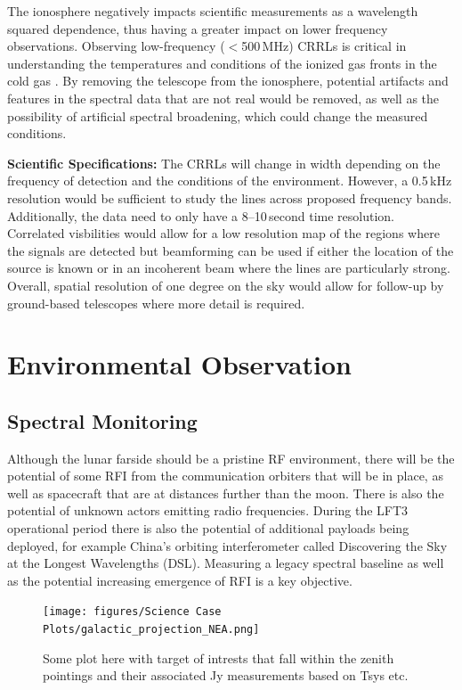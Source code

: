 The ionosphere negatively impacts scientific measurements as a wavelength squared dependence, thus having a greater impact on lower frequency observations. Observing low-frequency ($<$500\,MHz) CRRLs is critical in understanding the temperatures and conditions of the ionized gas fronts in the cold gas \citep{Salas_2018}. By removing the telescope from the ionosphere, potential artifacts and features in the spectral data that are not real would be removed, as well as the possibility of artificial spectral broadening, which could change the measured conditions.

\textbf{Scientific Specifications:} The CRRLs will change in width depending on the frequency of detection and the conditions of the environment. However, a 0.5\,kHz resolution would be sufficient to study the lines across proposed frequency bands. Additionally, the data need to only have a 8--10\,second time resolution. Correlated visbilities would allow for a low resolution map of the regions where the signals are detected but beamforming can be used if either the location of the source is known or in an incoherent beam where the lines are particularly strong. Overall, spatial resolution of one degree on the sky would allow for follow-up by ground-based telescopes where more detail is required.

\section{Environmental Observation}

\subsection{Spectral Monitoring}
Although the lunar farside should be a pristine RF environment, there will be the potential of some RFI from the communication orbiters that will be in place, as well as spacecraft that are at distances further than the moon.  There is also the potential of unknown actors emitting radio frequencies.  During the LFT3 operational period there is also the potential of additional payloads being deployed, for example China's orbiting interferometer called Discovering the Sky at the Longest Wavelengths (DSL).  Measuring a legacy spectral baseline as well as the potential increasing emergence of RFI is a key objective.

\begin{figure}[h]
    \centering
    \texttt{[image: figures/Science Case Plots/galactic\_projection\_NEA.png]}
    \caption{Some plot here with target of intrests that fall within the zenith pointings and their associated Jy measurements based on Tsys etc. }
    \label{fig:enter-label}
\end{figure}


